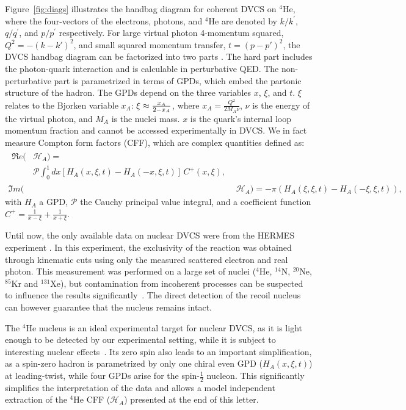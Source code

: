 \documentclass[twocolumn,nofootinbib,showpacs,prl,superscriptaddress,secnumarabic,amssymb,nobibnotes,aps,floatfix]{revtex4}
\begin{document}
Figure~\ref{fig:diags} illustrates the handbag diagram for coherent DVCS on 
$^4$He, where the four-vectors of the electrons, photons, and $^4$He are denoted 
by $k/k^\prime$, $q/q^\prime$, and $p/p^\prime$ respectively. For large 
virtual photon 4-momentum squared, $Q^2=-(k-k')^{2}$, and small squared 
momentum transfer, $t=(p-p')^{2}$, the DVCS handbag 
diagram can be factorized into two parts \cite{Freund_Collins,Ji_Osborne}. The 
hard part includes the photon-quark interaction and is calculable in 
perturbative QED. The non-perturbative part is parametrized in terms of GPDs, 
which embed the partonic structure of the hadron. The GPDs depend on the three 
variables $x$, $\xi$, and $t$. $\xi$ relates to the Bjorken variable 
$x_{A}$: $\xi\approx {{x_A}\over{2-x_A}}$, where $x_A=\frac{Q^2}{2M_A\nu}$, 
$\nu$ is the energy of the virtual photon, and 
$M_A$ is the nuclei mass. $x$ is the quark's internal loop momentum 
fraction and cannot be accessed experimentally in DVCS. We in fact measure 
Compton form factors (CFF), which are complex quantities defined as:
\begin{align}
\begin{split}
\Re e(&\mathcal{H}_{A}) = \\
    &\mathcal{P} 
\int_{0}^{1}dx[H_A(x,\xi,t)-H_A(-x,\xi,t)] \, C^{+}(x,\xi), 
\end{split} \\
\Im m(&\mathcal{H}_{A}) = - \pi ( H_A(\xi,\xi,t)-H_A(-\xi,\xi,t)),
\end{align}
with $H_A$ a GPD, $\mathcal{P}$ 
the Cauchy principal value integral, and a coefficient function $C^{+}= 
\frac{1}{x-\xi} + \frac{1}{x+\xi}$.

Until now, the only available data on nuclear DVCS were from the HERMES 
experiment \cite{Airapetian:2010nu}. In this experiment, the exclusivity of 
the reaction was obtained through kinematic cuts using only the measured 
scattered electron and real photon. This measurement was performed on a large 
set of nuclei ($^4$He, $^{14}$N, $^{20}$Ne, $^{85}$Kr and $^{131}$Xe), 
but contamination from incoherent processes can be suspected to influence the results 
significantly~\cite{Guzey:2003jh}. The direct detection of the recoil nucleus 
can however guarantee that the nucleus remains intact. 

The $^4$He nucleus is an ideal experimental target for nuclear DVCS, as it is 
light enough to be detected by our experimental setting, while it is subject 
to interesting nuclear effects~\cite{JSeely}. Its zero spin also leads to an 
important simplification, as a spin-zero hadron is parametrized by only one 
chiral even GPD ($H_{A}(x,\xi,t)$) at leading-twist, while four GPDs arise for 
the spin-$\frac{1}{2}$ nucleon. This significantly simplifies the interpretation of the 
data and allows a model independent extraction of the $^4$He CFF 
($\mathcal{H}_{A}$) presented at the end of this letter. 
\end{document}

